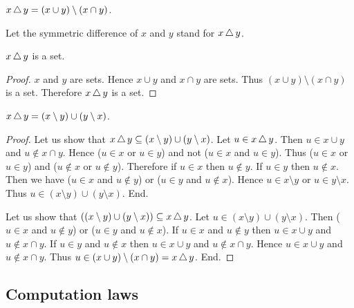 \documentclass[../../sets-and-functions.ftl.tex]{subfiles}
\begin{document}
  \begin{forthel}
    \begin{definition}
      $x \mathop{\triangle} y = (x \cup y) \setminus (x \cap y)$.
    \end{definition}

    Let the symmetric difference of $x$ and $y$ stand for $x \mathop{\triangle} y$.

    \begin{lemma}
      $x \mathop{\triangle} y$ is a set.
    \end{lemma}
    \begin{proof}
      $x$ and $y$ are sets.
      Hence $x \cup y$ and $x \cap y$ are sets.
      Thus $(x \cup y) \setminus (x \cap y)$ is a set.
      Therefore $x \mathop{\triangle} y$ is a set.
    \end{proof}

    \begin{proposition}[SF 01 04 470605]
      $x \mathop{\triangle} y = (x \setminus y) \cup (y \setminus x)$.
    \end{proposition}
    \begin{proof}
      Let us show that $x \mathop{\triangle} y \subseteq (x \setminus y) \cup
      (y \setminus x)$.
        Let $u \in x \mathop{\triangle} y$.
        Then $u \in x \cup y$ and $u \notin x \cap y$.
        Hence ($u \in x$ or $u \in y$) and not ($u \in x$ and $u \in y$).
        Thus ($u \in x$ or $u \in y$) and ($u \notin x$ or $u \notin y$).
        Therefore if $u \in x$ then $u \notin y$.
        If $u \in y$ then $u \notin x$.
        Then we have ($u \in x$ and $u \notin y$) or ($u \in y$ and
        $u \notin x$).
        Hence $u \in x \setminus y$ or $u \in y \setminus x$.
        Thus $u \in (x \setminus y) \cup (y \setminus x)$.
      End.

      Let us show that $((x \setminus y) \cup (y \setminus x)) \subseteq
      x \mathop{\triangle} y$.
        Let $u \in (x \setminus y) \cup (y \setminus x)$.
        Then ($u \in x$ and $u \notin y$) or ($u \in y$ and $u \notin x$).
        If $u \in x$ and $u \notin y$ then $u \in x \cup y$ and
        $u \notin x \cap y$.
        If $u \in y$ and $u \notin x$ then $u \in x \cup y$ and
        $u \notin x \cap y$.
        Hence $u \in x \cup y$ and $u \notin x \cap y$.
        Thus $u \in (x \cup y) \setminus (x \cap y) = x \mathop{\triangle} y$.
      End.
    \end{proof}
  \end{forthel}


  \subsection{Computation laws}
\end{document}
